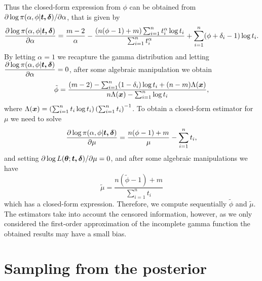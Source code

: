 Thus the closed-form expression from $\phi$ can be obtained from ${\partial \log \pi(\alpha,\phi|\boldsymbol{t,\delta})}{/ \partial \alpha}$, that is given by
\begin{equation*}
\begin{aligned} \frac{\partial \log \pi(\alpha,\phi|\boldsymbol{t,\delta})}{\partial \alpha} = \frac{m-2}{\alpha} - \frac{(n(\phi-1)+m)\sum_{i=1}^n t_i^{\alpha}\log t_i}{\sum_{i=1}^n t_i^\alpha} + \sum_{i=1}^n (\phi+\delta_i-1) \log t_i.
\end{aligned}
\end{equation*}
By letting $\alpha=1$ we recapture the gamma distribution and letting $\dfrac{\partial\log \pi(\alpha,\phi|\boldsymbol{t,\delta})}{\partial \alpha}=0$, after some algebraic manipulation we obtain
\begin{equation}\label{init1} 
\tilde{\phi} = \frac{(m-2) - \sum_{i=1}^n(1-\delta_i)\log t_i + (n-m)\Lambda(\boldsymbol{x}) }{n\Lambda(\boldsymbol{x})-\sum_{i=1}^n \log t_i}, 
\end{equation}
where $\Lambda(\boldsymbol{x}) = \left(\sum_{i=1}^n t_i\log t_i\right)\left(\sum_{i=1}^n t_i\right)^{-1}$. To obtain a closed-form estimator for $\mu$ we need to solve 
\begin{equation*}
\begin{aligned}
\frac{\partial \log \pi(\alpha,\phi|\boldsymbol{t,\delta})}{\partial \mu} = \frac{ n(\phi-1)+m}{\mu} -  \sum_{i=1}^n t_i,
\end{aligned}
\end{equation*}
and setting $\partial \log L(\boldsymbol{\theta};\boldsymbol{t,\delta}) /\partial \mu=0$, and after some algebraic manipulations we have
\begin{equation}\label{init2}
\tilde{\mu} = \frac{n(\tilde{\phi}-1)+m}{\sum_{i=1}^n t_i}
\end{equation}
which has a closed-form expression. Therefore, we compute sequentially $\tilde{\phi}$ and $\tilde{\mu}$. The estimators take into account the censored information, however, as we only considered the first-order approximation of the incomplete gamma function the obtained results may have a small bias.


\section{Sampling from the posterior}

